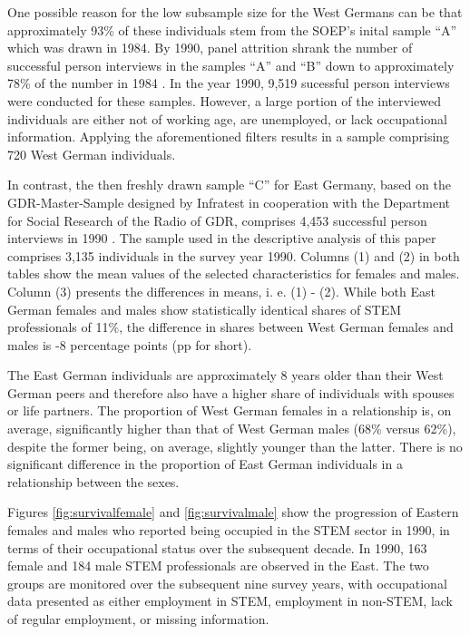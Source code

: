 \documentclass[a4paper, oneside, hyperfootnotes = false]{article}
\begin{document}
{One possible reason for the low subsample size for the West Germans can be that approximately 93\% of these individuals stem from the SOEP's inital sample ``A'' which was drawn in 1984.
By 1990, panel attrition shrank the number of successful person interviews in the samples ``A'' and ``B'' down to approximately 78\% of the number in 1984 \citep{Siegers2022}.
In the year 1990, 9,519 sucessful person interviews were conducted for these samples.
However, a large portion of the interviewed individuals are either not of working age, are unemployed, or lack occupational information.
Applying the aforementioned filters results in a sample comprising 720 West German individuals.

In contrast, the then freshly drawn sample ``C'' for East Germany, based on the GDR-Master-Sample designed by Infratest in cooperation with the Department for Social Research of the Radio of GDR, comprises 4,453 successful person interviews in 1990 \citep{Infratest2011, Siegers2022}.
The sample used in the descriptive analysis of this paper comprises 3,135 individuals in the survey year 1990.
Columns (1) and (2) in both tables show the mean values of the selected characteristics for females and males.
Column (3) presents the differences in means, i. e. (1) - (2).
While both East German females and males show statistically identical shares of STEM professionals of 11\%, the difference in shares between West German females and males is -8 percentage points (pp for short).

The East German individuals are approximately 8 years older than their West German peers and therefore also have a higher share of individuals with spouses or life partners.
The proportion of West German females in a relationship is, on average, significantly higher than that of West German males (68\% versus 62\%), despite the former being, on average, slightly younger than the latter.
There is no significant difference in the proportion of East German individuals in a relationship between the sexes.

Figures \ref{fig:survivalfemale} and \ref{fig:survivalmale} show the progression of Eastern females and males who reported being occupied in the STEM sector in 1990, in terms of their occupational status over the subsequent decade.
In 1990, 163 female and 184 male STEM professionals are observed in the East.
The two groups are monitored over the subsequent nine survey years, with occupational data presented as either employment in STEM, employment in non-STEM, lack of regular employment, or missing information.

}
\end{document}
